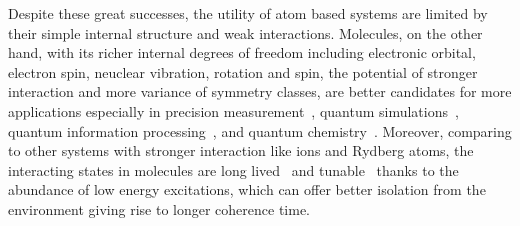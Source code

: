 Despite these great successes, the utility of atom based systems
are limited by their simple internal structure and weak interactions.
Molecules, on the other hand, with its richer internal degrees of freedom
including electronic orbital, electron spin, neuclear vibration, rotation and spin,
the potential of stronger interaction and more variance of symmetry classes,
are better candidates for more applications especially in
precision measurement~\cite{bickman_preparation_2009,hudson_improved_2011,eckel_search_2013,
  kozyryev_precision_2017,cairncross_precision_2017,acme_collaboration_improved_2018,
  kondov_molecular_2019,flambaum_electric_2020},
quantum simulations~\cite{micheli_toolbox_2006,buchler_strongly_2007,gorshkov_tunable_2011,
  baranov_condensed_2012,yao_realizing_2013,syzranov_spinorbital_2014,
  wall_quantum_2015,wall_realizing_2015,peter_topological_2015,
  yao_quantum_2018,sundar_synthetic_2018,schuster_realizing_2019},
quantum information processing~\cite{demille_quantum_2002,ni_dipolar_2018,
  hudson_dipolar_2018,lin_quantum_2020},
and quantum chemistry~\cite{balakrishnan_perspective_2016,hu_direct_2019,
  segev_collisions_2019,jongh_imaging_2020}.
Moreover, comparing to other systems with stronger interaction like ions and Rydberg atoms,
the interacting states in molecules are long lived~\cite{fedorov_accurate_2014}
and tunable~\cite{giovanazzi_tuning_2002} thanks to the abundance of low energy excitations,
which can offer better isolation from the environment giving rise to longer coherence time.

